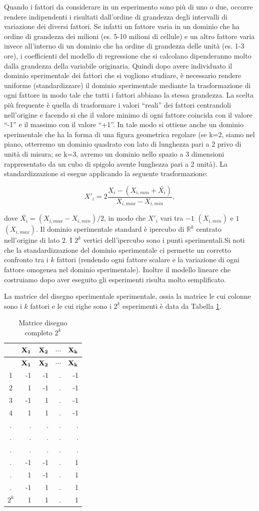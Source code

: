 \documentclass[
  11pt,
]{book}
\begin{document}
Quando i fattori da considerare in un esperimento sono più di uno o due,
occorre rendere indipendenti i risultati dall'ordine di grandezza degli
intervalli di variazione dei diversi fattori. Se infatti un fattore
varia in un dominio che ha ordine di grandezza dei milioni (es. 5-10
milioni di cellule) e un altro fattore varia invece all'interno di un
dominio che ha ordine di grandezza delle unità (es. 1-3 ore), i
coefficienti del modello di regressione che si calcolano dipenderanno
molto dalla grandezza della variabile originaria. Quindi dopo avere
individuato il dominio sperimentale dei fattori che si vogliono
studiare, è necessario rendere uniforme (standardizzare) il dominio
sperimentale mediante la trasformazione di ogni fattore in modo tale che
tutti i fattori abbiano la stessa grandezza. La scelta più frequente è
quella di trasformare i valori ``reali'' dei fattori centrandoli
nell'origine e facendo si che il valore minimo di ogni fattore coincida
con il valore ``-1'' e il massimo con il valore ``+1''. In tale modo si
ottiene anche un dominio sperimentale che ha la forma di una figura
geometrica regolare (se k=2, siamo nel piano, otterremo un dominio
quadrato con lato di lunghezza pari a 2 privo di unità di misura; se
k=3, avremo un dominio nello spazio a 3 dimensioni rappresentato da un
cubo di spigolo avente lunghezza pari a 2 unità). La standardizzazione
si esegue applicando la seguente trasformazione:

\[
X'_i=2\frac{X_i-(X_{i,min}+\bar{X_i})}{X_{i,max}-X_{i,min}},
\]

dove \(\bar{X_i}=(X_{i,max}-X_{i,min})/2\), in modo che \(X'_i\) vari tra
\(-1\) \((X_{i,min})\) e \(1\) \((X_{i,max})\). Il dominio sperimentale standard
è ipercubo di \(\mathbb{R}^k\) centrato nell'origine di lato \(2\). I \(2^k\)
vertici dell'ipercubo sono i punti sperimentali.\newline Si noti che la
standardizzazione del dominio sperimentale ci permette un corretto
confronto tra i \(k\) fattori (rendendo ogni fattore scalare e la
variazione di ogni fattore omogenea nel dominio sperimentale). Inoltre
il modello lineare che costruiamo dopo aver eseguito gli esperimenti
risulta molto semplificato.

La matrice del disegno sperimentale sperimentale, ossia la matrice le
cui colonne sono i \(k\) fattori e le cui righe sono i \(2^k\) esperimenti è
data da Tabella \ref{tab:MatrDisFull}.

\begin{longtable}[]{@{}crrrr@{}}
\caption{\label{tab:MatrDisFull} Matrice disegno completo \(2^k\)}\tabularnewline
\toprule
& \(\bf{X_1}\) & \(\bf{X_2}\) & \(\cdots\) & \(\bf{X_k}\)\tabularnewline
\midrule
\endfirsthead
\toprule
& \(\bf{X_1}\) & \(\bf{X_2}\) & \(\cdots\) & \(\bf{X_k}\)\tabularnewline
\midrule
\endhead
1 & -1 & -1 & . & -1\tabularnewline
2 & 1 & -1 & . & -1\tabularnewline
3 & -1 & 1 & . & -1\tabularnewline
4 & 1 & 1 & . & -1\tabularnewline
. & . & . & . & .\tabularnewline
. & . & . & . & .\tabularnewline
. & . & . & . & .\tabularnewline
. & -1 & -1 & . & 1\tabularnewline
. & 1 & -1 & . & 1\tabularnewline
. & -1 & 1 & . & 1\tabularnewline
\(2^k\) & 1 & 1 & . & 1\tabularnewline
\bottomrule
\end{longtable}
\end{document}
